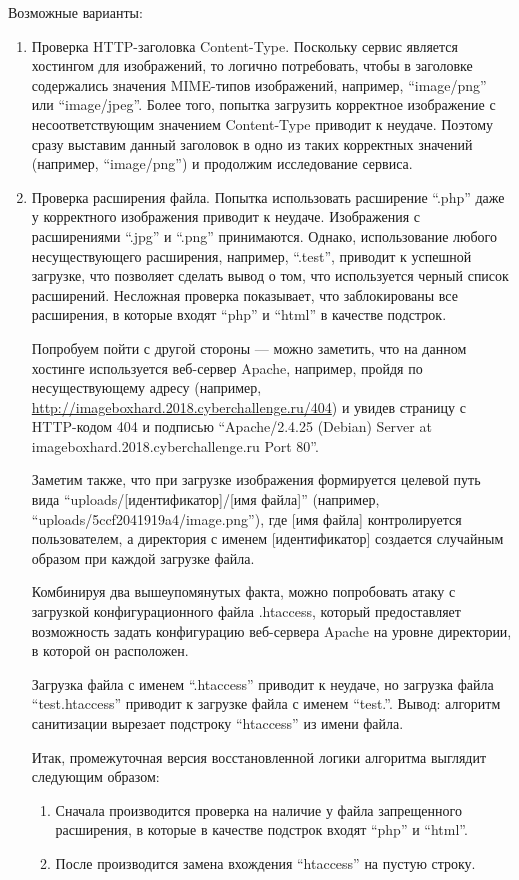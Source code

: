 Возможные варианты:
\begin{enumerate}
    \item Проверка HTTP-заголовка Content-Type. Поскольку сервис является хостингом для изображений, то логично потребовать, чтобы в заголовке содержались значения MIME-типов изображений, например, “image/png” или \linebreak “image/jpeg”. Более того, попытка загрузить корректное изображение с несоответствующим значением Content-Type приводит к неудаче. Поэтому сразу выставим данный заголовок в одно из таких корректных значений (например, “image/png”) и продолжим исследование сервиса.
    \item Проверка расширения файла. Попытка использовать расширение “.php” даже у корректного изображения приводит к неудаче. Изображения с расширениями “.jpg” и “.png” принимаются. Однако, использование любого несуществующего расширения, например, “.test”, приводит к успешной загрузке, что позволяет сделать вывод о том, что используется черный список расширений. Несложная проверка показывает, что заблокированы все расширения, в которые входят “php” и “html” в качестве подстрок. 
    
    Попробуем пойти с другой стороны — можно заметить, что на данном хостинге используется веб-сервер Apache, например, пройдя по несуществующему адресу (например, \url{http://imageboxhard.2018.cyberchallenge.ru/404}) и увидев страницу с HTTP-кодом 404 и подписью “Apache/2.4.25 (Debian) Server at imageboxhard.2018.cyberchallenge.ru Port 80”.

    Заметим также, что при загрузке изображения формируется целевой путь вида “uploads/[идентификатор]/[имя файла]” (например, “uploads/5ccf2041919a4/\linebreak image.png”), где [имя файла] контролируется пользователем, а директория с именем [идентификатор] создается случайным образом при каждой загрузке файла.

    Комбинируя два вышеупомянутых факта, можно попробовать атаку с загрузкой конфигурационного файла .htaccess, который предоставляет возможность задать конфигурацию веб-сервера Apache на уровне директории, в которой он расположен.

    Загрузка файла с именем “.htaccess” приводит к неудаче, но загрузка файла “test.htaccess” приводит к загрузке файла с именем “test.”. Вывод: алгоритм санитизации вырезает подстроку “htaccess” из имени файла.

    Итак, промежуточная версия восстановленной логики алгоритма выглядит следующим образом:
    \begin{enumerate}
        \item Сначала производится проверка на наличие у файла запрещенного расширения, в которые в качестве подстрок входят “php” и “html”.
        \item После производится замена вхождения “htaccess” на пустую строку.
    \end{enumerate}
    

\end{enumerate}
